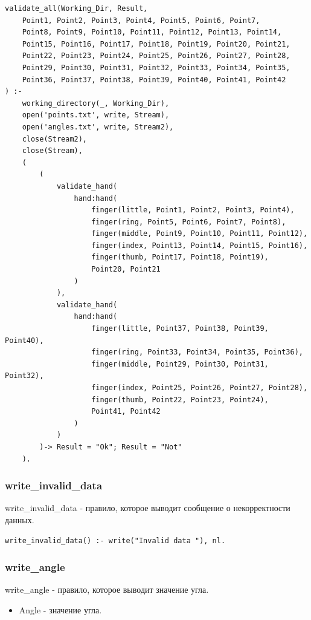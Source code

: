 \begin{lstlisting}[caption=Реализация правила validate\_all, label=rules:validateall]
validate_all(Working_Dir, Result,
	Point1, Point2, Point3, Point4, Point5, Point6, Point7,
	Point8, Point9, Point10, Point11, Point12, Point13, Point14,
	Point15, Point16, Point17, Point18, Point19, Point20, Point21,
	Point22, Point23, Point24, Point25, Point26, Point27, Point28,
	Point29, Point30, Point31, Point32, Point33, Point34, Point35,
	Point36, Point37, Point38, Point39, Point40, Point41, Point42
) :-
	working_directory(_, Working_Dir),
	open('points.txt', write, Stream),
	open('angles.txt', write, Stream2),
	close(Stream2),
	close(Stream),
	(	
		(
			validate_hand(
				hand:hand(
					finger(little, Point1, Point2, Point3, Point4),
					finger(ring, Point5, Point6, Point7, Point8),
					finger(middle, Point9, Point10, Point11, Point12),
					finger(index, Point13, Point14, Point15, Point16),
					finger(thumb, Point17, Point18, Point19),
					Point20, Point21
				)
			),
			validate_hand(
				hand:hand(
					finger(little, Point37, Point38, Point39, Point40),
					finger(ring, Point33, Point34, Point35, Point36),
					finger(middle, Point29, Point30, Point31, Point32),
					finger(index, Point25, Point26, Point27, Point28),
					finger(thumb, Point22, Point23, Point24),
					Point41, Point42
				)
			)
		)-> Result = "Ok"; Result = "Not"
	).
\end{lstlisting}

\subsubsection{write\_invalid\_data}
\hspace{0.6cm} write\_invalid\_data - правило, которое выводит сообщение о некорректности данных.

\begin{lstlisting}[caption=Реализация правила write\_invalid\_data, label=rules:writeinvaliddata]
write_invalid_data() :- write("Invalid data "), nl.
\end{lstlisting}

\subsubsection{write\_angle}
\hspace{0.6cm} write\_angle - правило, которое выводит значение угла.

\begin{itemize}
	\item Angle - значение угла.
\end{itemize}

